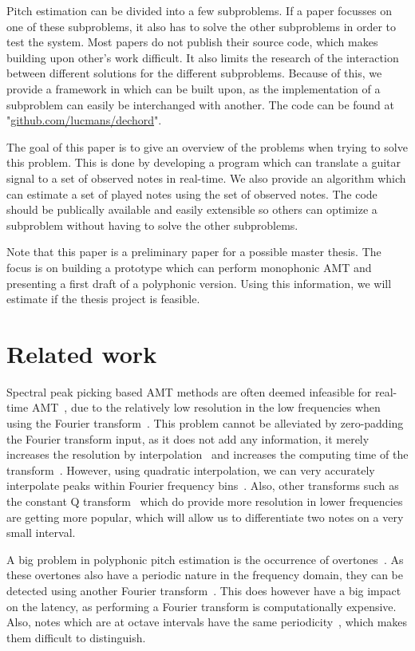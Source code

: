 \documentclass[10pt,twocolumn]{article}
\begin{document}
Pitch estimation can be divided into a few subproblems. If a paper focusses on one of these subproblems, it also has to solve the other subproblems in order to test the system. Most papers do not publish their source code, which makes building upon other's work difficult. It also limits the research of the interaction between different solutions for the different subproblems. Because of this, we provide a framework in which can be built upon, as the implementation of a subproblem can easily be interchanged with another. The code can be found at "\url{github.com/lucmans/dechord}".

The goal of this paper is to give an overview of the problems when trying to solve this problem. This is done by developing a program which can translate a guitar signal to a set of observed notes in real-time. We also provide an algorithm which can estimate a set of played notes using the set of observed notes. The code should be publically available and easily extensible so others can optimize a subproblem without having to solve the other subproblems.

Note that this paper is a preliminary paper for a possible master thesis. The focus is on building a prototype which can perform monophonic AMT and presenting a first draft of a polyphonic version. Using this information, we will estimate if the thesis project is feasible.


\section{Related work}
Spectral peak picking based AMT methods are often deemed infeasible for real-time AMT~\cite{hater}, due to the relatively low resolution in the low frequencies when using the Fourier transform~\cite{theoretisch}. This problem cannot be alleviated by zero-padding the Fourier transform input, as it does not add any information, it merely increases the resolution by interpolation~\cite{infomax}\cite{infomax2} and increases the computing time of the transform~\cite{boek}. However, using quadratic interpolation, we can very accurately interpolate peaks within Fourier frequency bins~\cite{interpol}. Also, other transforms such as the constant Q transform~\cite{cqt} which do provide more resolution in lower frequencies are getting more popular, which will allow us to differentiate two notes on a very small interval.

A big problem in polyphonic pitch estimation is the occurrence of overtones~\cite{oud}. As these overtones also have a periodic nature in the frequency domain, they can be detected using another Fourier transform~\cite{double}. This does however have a big impact on the latency, as performing a Fourier transform is computationally expensive. Also, notes which are at octave intervals have the same periodicity~\cite{octave}, which makes them difficult to distinguish.
\end{document}
